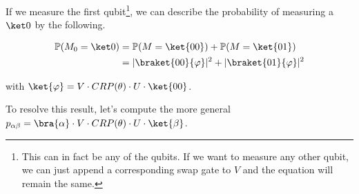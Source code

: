 If we measure the first qubit\footnote{
    This can in fact be any of the qubits.
    If we want to measure any other qubit, we can just append a corresponding
    swap gate to $V$ and the equation will remain the same.
}, we can describe the probability of measuring a $\ket 0$ by the following.

\begin{equation}
    \label{eq1}
    \begin{split}
        \mathbb{P}(M_0 = \ket 0)
            &= \mathbb{P}(M = \ket{00}) + \mathbb{P}(M = \ket{01}) \\
            &= \lvert\braket{00}{\varphi}\rvert^2 + \lvert\braket{01}{\varphi}\rvert^2
    \end{split}
\end{equation}

with $\ket{\varphi} = V \cdot CRP(\theta) \cdot U \cdot \ket{00}$.

To resolve this result, let's compute the more general
$p_{\alpha\beta} = \bra{\alpha} \cdot V \cdot CRP(\theta) \cdot U \cdot \ket{\beta}$.

